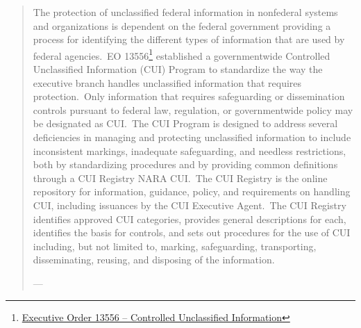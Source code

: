 \begin{formal}
    
\begin{quote} 
\begin{minipage}{\linewidth}
\renewcommand\thempfootnote{\textcolor{orange}{\arabic{footnote}}}

The protection of unclassified federal information in nonfederal systems and organizations is dependent on the federal government providing a process for identifying the different types of information that are used by federal agencies.\ EO 13556\footnote{\href{https://obamawhitehouse.archives.gov/the-press-office/2010/11/04/executive-order-13556-controlled-unclassified-information}{Executive Order 13556 -- Controlled Unclassified Information}} established a governmentwide Controlled Unclassified Information (CUI) Program to standardize the way the executive branch handles unclassified information that requires protection.\ Only information that requires safeguarding or dissemination controls pursuant to federal law, regulation, or governmentwide policy may be designated as CUI.\ The CUI Program is designed to address several deficiencies in managing and protecting unclassified information to include inconsistent markings, inadequate safeguarding, and needless restrictions, both by standardizing procedures and by providing common definitions through a CUI Registry NARA CUI.\ The CUI Registry is the online repository for information, guidance, policy, and requirements on handling CUI, including issuances by the CUI Executive Agent.\ The CUI Registry identifies approved CUI categories, provides general descriptions for each, identifies the basis for controls, and sets out procedures for the use of CUI including, but not limited to, marking, safeguarding, transporting, disseminating, reusing, and disposing of the information.

\hfill
---\cite{csfNIST800171}
\end{minipage}
\end{quote}
\end{formal}

